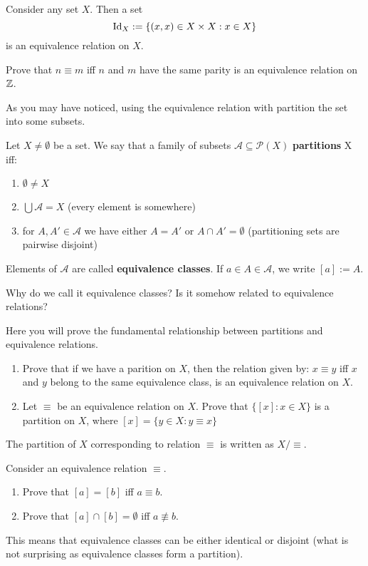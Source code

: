 \begin{example}
  Consider any set $X$. Then a set $$\text{Id}_X := \{(x,x)\in X\times X : x\in X\}$$
  is an equivalence relation on $X$.
\end{example}

\begin{exercise}
  Prove that $n\equiv m$ iff $n$ and $m$ have the same parity is an equivalence relation on $\mathbb Z$.
\end{exercise}

As you may have noticed, using the equivalence relation with partition the set into some subsets.

\begin{definition}
  Let $X\neq \emptyset$ be a set. We say that a family of subsets $\mathcal A\subseteq \mathcal P(X)$ \textbf{partitions} X iff:
  \begin{enumerate}
    \item $\emptyset \neq X$
    \item $\bigcup \mathcal A=X$ (every element is somewhere)
    \item for $A,A'\in \mathcal A$ we have either $A=A'$ or $A\cap A'=\emptyset$ (partitioning sets are pairwise disjoint)
  \end{enumerate}
  Elements of $\mathcal A$ are called \textbf{equivalence classes}. If $a\in A\in\mathcal A$, we write $[a]:=A$.
\end{definition}

Why do we call it equivalence classes? Is it somehow related to equivalence relations?

\begin{exercise}
  Here you will prove the fundamental relationship between partitions and equivalence relations.
  \begin{enumerate}
    \item Prove that if we have a parition on $X$, then the relation given by: $x\equiv y$ iff $x$ and $y$ belong to the same equivalence class, is an equivalence relation on $X$.
    \item Let $\equiv$ be an equivalence relation on $X$. Prove that $\{[x] : x\in X\}$ is a partition on $X$, where $[x]=\{y\in X : y\equiv x\}$
  \end{enumerate}
  The partition of $X$ corresponding to relation $\equiv$ is written as $X/\equiv.$
\end{exercise}

\begin{exercise}
  Consider an equivalence relation $\equiv$.
  \begin{enumerate}
    \item Prove that $[a]=[b]$ iff $a\equiv b$.
    \item Prove that $[a]\cap [b]=\emptyset$ iff $a\not\equiv b$.
  \end{enumerate}
  This means that equivalence classes can be either identical or disjoint (what is not surprising as equivalence classes form a partition).
\end{exercise}

